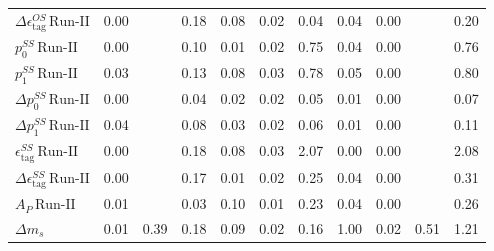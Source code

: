 \begin{tabular}{l  c  c  c  c  c  c  c  c  c  | c }
$\Delta \epsilon_{\text{tag}}^{OS} \, \text{Run-II}$ & 0.00 &  & 0.18 & 0.08 & 0.02 & 0.04 & 0.04 & 0.00 &  & 0.20 \\ 
$p_{0}^{SS} \, \text{Run-II}$ & 0.00 &  & 0.10 & 0.01 & 0.02 & 0.75 & 0.04 & 0.00 &  & 0.76 \\ 
$p_{1}^{SS} \, \text{Run-II}$ & 0.03 &  & 0.13 & 0.08 & 0.03 & 0.78 & 0.05 & 0.00 &  & 0.80 \\ 
$\Delta p_{0}^{SS} \, \text{Run-II}$ & 0.00 &  & 0.04 & 0.02 & 0.02 & 0.05 & 0.01 & 0.00 &  & 0.07 \\ 
$\Delta p_{1}^{SS} \, \text{Run-II}$ & 0.04 &  & 0.08 & 0.03 & 0.02 & 0.06 & 0.01 & 0.00 &  & 0.11 \\ 
$\epsilon_{\text{tag}}^{SS} \, \text{Run-II}$ & 0.00 &  & 0.18 & 0.08 & 0.03 & 2.07 & 0.00 & 0.00 &  & 2.08 \\ 
$\Delta \epsilon_{\text{tag}}^{SS} \, \text{Run-II}$ & 0.00 &  & 0.17 & 0.01 & 0.02 & 0.25 & 0.04 & 0.00 &  & 0.31 \\ 
$A_{P} \, \text{Run-II}$ & 0.01 &  & 0.03 & 0.10 & 0.01 & 0.23 & 0.04 & 0.00 &  & 0.26 \\ 
$\Delta m_{s}$ & 0.01 & 0.39 & 0.18 & 0.09 & 0.02 & 0.16 & 1.00 & 0.02 & 0.51 & 1.21 \\ 
\hline
\hline
\end{tabular}

